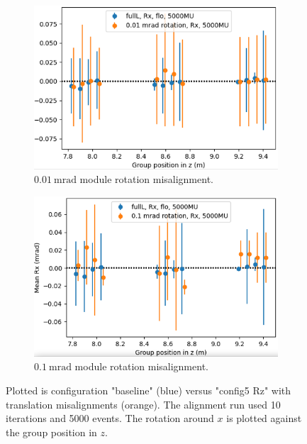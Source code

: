 \begin{figure}
  \centering
  \begin{subfigure}[b]{0.48\textwidth}
    \centering
    \includegraphics[width=\textwidth]{plots/misalign_rota/001_rot_Rx.png}
    \caption{$\SI{0.01}{\milli\radian}$ module rotation misalignment.}
    \label{fig:001Rx}
  \end{subfigure}
  \hfill
  \begin{subfigure}[b]{0.48\textwidth}
    \centering
    \includegraphics[width=\textwidth]{plots/misalign_rota/01_rot_Rx.png}
    \caption{$\SI{0.1}{\milli\radian}$ module rotation misalignment.}
    \label{fig:01Rx}
  \end{subfigure}
  \caption{Plotted is configuration "baseline" (blue) versus "config5 Rz" with translation misalignments (orange). The alignment run used 10 iterations and 5000 events. The rotation around $x$ is plotted against the group position in $z$.}
  \label{fig:mis_rot_Rx}
\end{figure}

